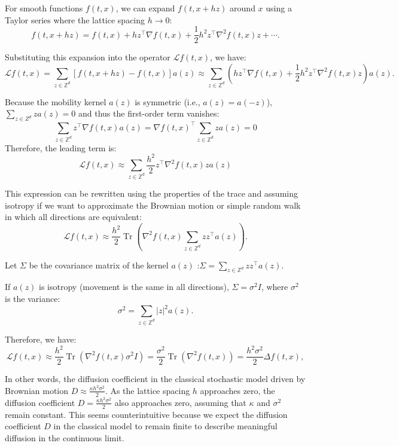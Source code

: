 \documentclass[sn-basic]{sn-jnl}%
\theoremstyle{thmstyleone}%
\theoremstyle{thmstyletwo}%
\theoremstyle{thmstylethree}%
\numberwithin{equation}{theorem}
\begin{document}
For smooth functions $f(t,x)$, we can expand $f(t,x+hz)$ around $x$ using a Taylor series where the lattice spacing $h\rightarrow 0$:
$$
f(t,x+hz)=f(t,x)+hz^{\top} \nabla f(t,x)+\frac{1}{2} h^2z^{\top} \nabla^2 f(t,x) z+\cdots .
$$


Substituting this expansion into the operator $\mathcal{L} f(t,x)$, we have:
$$
\mathcal{L} f(t,x)=\sum_{z \in \mathbb{Z}^d}[f(t,x+hz)-f(t,x)] a(z) \approx \sum_{z \in \mathbb{Z}^d}\left(hz^{\top} \nabla f(t,x)+\frac{1}{2}h^2z^{\top} \nabla^2 f(t,x) z\right) a(z) .
$$



Because the mobility kernel $a(z)$ is symmetric (i.e., $a(z)=a(-z)$), $\sum\limits_{z\in Z^d} z a(z)=0$ and thus the first-order term vanishes:
$$
\sum_{z \in \mathbb{Z}^d} z^{\top} \nabla f(t,x) a(z)=\nabla f(t,x)^{\top} \sum_{z \in \mathbb{Z}^d} z a(z)=0
$$
Therefore, the leading term is:
$$
\mathcal{L} f(t,x) \approx \sum_{z \in \mathbb{Z}^d} \frac{h^2}{2} z^{\top} \nabla^2 f(t,x) z a(z)
$$

This expression can be rewritten using the properties of the trace and assuming isotropy if we want to approximate the Brownian motion or simple random walk in which all directions are equivalent:
$$
\mathcal{L} f(t,x) \approx \frac{h^2}{2} \operatorname{Tr}\left(\nabla^2 f(t,x) \sum_{z \in \mathbb{Z}^d} z z^{\top} a(z)\right) .
$$


Let $\Sigma$ be the covariance matrix of the kernel $a(z)$ :$
\Sigma=\sum_{z \in \mathbb{Z}^d} z z^{\top} a(z) .
$


If $a(z)$ is isotropy (movement is the same in all directions), $\Sigma=\sigma^2 I$, where $\sigma^2$ is the variance:
$$
\sigma^2=\sum_{z \in \mathbb{Z}^d}|z|^2 a(z) .
$$


Therefore, we have:
$$
\mathcal{L} f(t,x) \approx \frac{h^2}{2} \operatorname{Tr}\left(\nabla^2 f(t,x) \sigma^2 I\right)=\frac{\sigma^2}{2} \operatorname{Tr}\left(\nabla^2 f(t,x)\right)=\frac{h^2\sigma^2}{2} \Delta f(t,x),
$$

In other words, the diffusion coefficient in the classical stochastic model driven by Brownian motion $D\approx \displaystyle\frac{\kappa h^2\sigma^2}{2}$.
As the lattice spacing $h$ approaches zero, the diffusion coefficient $D=\frac{\kappa h^2 \sigma^2}{2}$ also approaches zero, assuming that $\kappa$ and $\sigma^2$ remain constant. This seems counterintuitive because we expect the diffusion coefficient $D$ in the classical model to remain finite to describe meaningful diffusion in the continuous limit.
\end{document}
